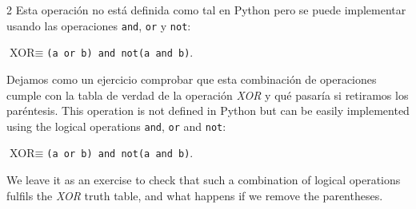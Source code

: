 \begin{paracol}{2}
Esta operación no está definida como tal en Python pero se puede implementar usando las operaciones \texttt{and}, \texttt{or} y \texttt{not}:

$\text{XOR} \equiv$\texttt{(a or b) and not(a and b)}. 

Dejamos como un ejercicio comprobar que esta combinación de operaciones cumple con la tabla de verdad de la operación \emph{XOR} y qué pasaría si retiramos los paréntesis.
\switchcolumn
This operation is not defined in Python but can be easily implemented using the logical operations \texttt{and}, \texttt{or} and \texttt{not}:

$\text{XOR} \equiv$\texttt{(a or b) and not(a and b)}. 

We leave it as an exercise to check that such a combination of logical operations fulfils the \emph{XOR} truth table, and what happens if we remove the parentheses.    
\end{paracol}


